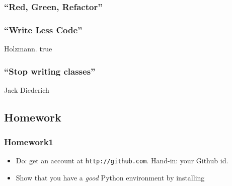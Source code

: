 \subsubsection{\texorpdfstring{``Red, Green,
Refactor''}{Red, Green, Refactor}}\label{red-green-refactor}

\subsubsection{\texorpdfstring{``Write Less
Code''}{Write Less Code}}\label{write-less-code}

Holzmann. true

\subsubsection{\texorpdfstring{``Stop writing
classes''}{Stop writing classes}}\label{stop-writing-classes}

Jack Diederich

\subsection{Homework}\label{homework}

\subsubsection{Homework1}\label{homework1}

\begin{itemize}
\itemsep1pt\parskip0pt
\item
  Do: get an account at \texttt{http://github.com}. Hand-in: your Github
  id.
\item
  Show that you have a \emph{good} Python environment by installing
\end{itemize}
